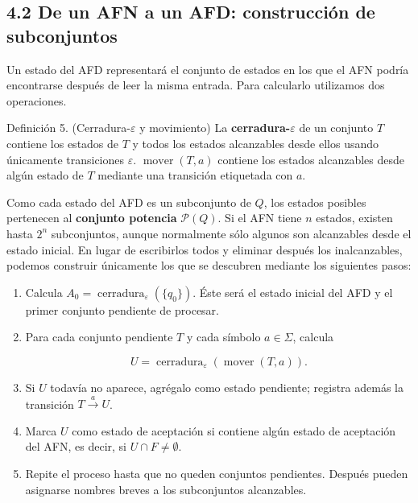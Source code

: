 \documentclass[11pt,spanish]{article}
\begin{document}
\subsection*{4.2 De un AFN a un AFD: construcción de subconjuntos}

Un estado del AFD representará el conjunto de estados en los que el AFN podría encontrarse después de leer la misma entrada. Para calcularlo utilizamos dos operaciones.

\begin{definicion}{Definición 5. (Cerradura-\(\varepsilon\) y movimiento)}
La \textbf{cerradura-\(\varepsilon\)} de un conjunto \(T\) contiene los estados de \(T\) y todos los estados alcanzables desde ellos usando únicamente transiciones \(\varepsilon\). \(\operatorname{mover}(T,a)\) contiene los estados alcanzables desde algún estado de \(T\) mediante una transición etiquetada con \(a\).
\end{definicion}

Como cada estado del AFD es un subconjunto de \(Q\), los estados posibles pertenecen al \textbf{conjunto potencia} \(\mathcal{P}(Q)\). Si el AFN tiene \(n\) estados, existen hasta \(2^n\) subconjuntos, aunque normalmente sólo algunos son alcanzables desde el estado inicial. En lugar de escribirlos todos y eliminar después los inalcanzables, podemos construir únicamente los que se descubren mediante los siguientes pasos:

\begin{enumerate}[leftmargin=*]
    \item Calcula \(A_0=\operatorname{cerradura}_{\varepsilon}(\{q_0\})\). Éste será el estado inicial del AFD y el primer conjunto pendiente de procesar.
    \item Para cada conjunto pendiente \(T\) y cada símbolo \(a\in\Sigma\), calcula

\[
U=\operatorname{cerradura}_{\varepsilon}(\operatorname{mover}(T,a)).
\]

    \item Si \(U\) todavía no aparece, agrégalo como estado pendiente; registra además la transición \(T\xrightarrow{a}U\).
    \item Marca \(U\) como estado de aceptación si contiene algún estado de aceptación del AFN, es decir, si \(U\cap F\neq\emptyset\).
    \item Repite el proceso hasta que no queden conjuntos pendientes. Después pueden asignarse nombres breves a los subconjuntos alcanzables.
\end{enumerate}
\end{document}
